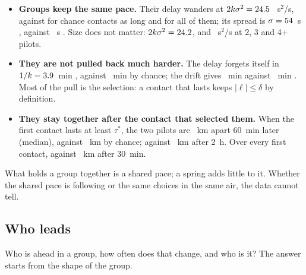 \begin{itemize}
  \item \textbf{Groups keep the same pace.} Their delay wanders at $2k\sigma^2=24.5$ \StQRealBand~s$^2$/s,
        against \StQChanceLong{} \StQChanceLongBand{} for chance contacts as long and \StQChance{}
        \StQChanceBand{} for all of them; its spread is $\sigma=54$~s \StSigmaRealBand, against
        \StSigmaChance~s \StSigmaChanceBand. Size does not matter: $2k\sigma^2=24.2$, \StQThree{} and
        \StQFour~s$^2$/s at 2, 3 and 4+ pilots.
  \item \textbf{They are not pulled back much harder.} The delay forgets itself in $1/k=3.9$~min
        \StOuRealBand, against \StOuChance~min \StOuChanceBand{} by chance; the drift gives \StDriftReal~min
        \StDriftRealBand{} against \StDriftChance~min \StDriftChanceBand. Most of the pull is the
        selection: a contact that lasts keeps $|\ell|\le\delta$ by definition.
  \item \textbf{They stay together after the contact that selected them.} When the first contact lasts
        at least $\tau^*$, the two pilots are \StSepRealLongSixty~km apart 60~min later (median), against
        \StSepChanceLongSixty~km by chance; \StSepRealLongTwoHours{} against \StSepChanceLongTwoHours~km
        after 2~h. Over every first contact, \StSepRealThirty{} against \StSepChanceThirty~km after 30~min.
\end{itemize}
What holds a group together is a shared pace; a spring adds little to it. Whether the shared pace
is following or the same choices in the same air, the data cannot tell.

\subsection{Who leads}\label{sec:leaders}

Who is ahead in a group, how often does that change, and who is it? The answer starts from the
shape of the group.

